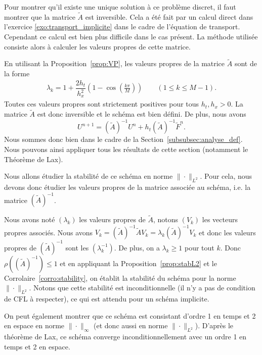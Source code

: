 \documentclass[12pt,a4paper,twoside]{article}
\begin{document}
Pour montrer qu'il existe une unique solution \`a ce probl\`eme discret,
il faut montrer que la matrice $\widetilde{A}$ est inversible.
Cela a \'et\'e fait par un calcul direct dans l'exercice \ref{exo:transport_implicite}
dans le cadre de l'\'equation de transport.
Cependant ce calcul est bien plus difficile dans le cas pr\'esent.
La m\'ethode utilis\'ee consiste alors \`a calculer les valeurs propres de cette matrice.

En utilisant la Proposition~\ref{prop:VP}, les valeurs propres de la matrice $\widetilde{A}$
sont de la forme
\begin{align*}
  \lambda_k = 1 + \dfrac{2 h_t}{h_x^2} \left(1 - \cos \left(\frac{k \pi}{M} \right) \right)
  \qquad (1 \leq k \leq M-1) .
\end{align*}
Toutes ces valeurs propres sont strictement positives pour tous $h_t , h_x > 0$. 
La matrice $\widetilde{A}$ est donc inversible et le sch\'ema est bien d\'efini.
De plus, nous avons
\begin{equation*}
  U^{n+1} = (\widetilde{A})^{-1} U^n + h_t (\widetilde{A})^{-1} \widetilde{F}^n .
\end{equation*}
Nous sommes donc bien dans le cadre de la Section~\ref{subsubsec:analyse_def}.
Nous pouvons ainsi appliquer tous les r\'esultats de cette section
(notamment le Th\'eor\`eme de Lax).

Nous allons \'etudier la stabilit\'e de ce sch\'ema en norme $\| \cdot \|_{L^2}$.
Pour cela, nous devons donc \'etudier les valeurs propres de la matrice associ\'ee au sch\'ema,
i.e. la matrice $(\widetilde{A})^{-1}$.

Nous avons not\'e $(\lambda_k)$ les valeurs propres de $\widetilde{A}$, notons $(V_k)$
les vecteurs propres associ\'es. Nous avons
$V_k = (\widetilde{A})^{-1} \widetilde{A} V_k = \lambda_k (\widetilde{A})^{-1} V_k$
et donc les valeurs propres de $(\widetilde{A})^{-1}$ sont les
$(\lambda_k^{-1})$. De plus, on a $\lambda_k \geq 1$ pour tout $k$.
Donc $\rho((\widetilde{A})^{-1}) \leq 1$ et en appliquant
la Proposition~\ref{prop:stabL2} et le Corrolaire~\ref{corro:stability}, on
\'etablit la stabilit\'e du sch\'ema pour la norme $\| \cdot \|_{L^2}$.
Notons que cette stabilit\'e est inconditionnelle (il n'y a pas de condition de CFL \`a respecter),
ce qui est attendu pour un sch\'ema implicite.


On peut \'egalement montrer que ce sch\'ema est consistant d'ordre 1 en temps
et 2 en espace en norme $\| \cdot \|_{\infty}$ (et donc aussi en norme $\| \cdot \|_{L^2}$).
D'apr\`es le th\'eor\`eme de Lax, ce sch\'ema converge inconditionnellement avec un ordre
1 en temps et 2 en espace.
\end{document}
